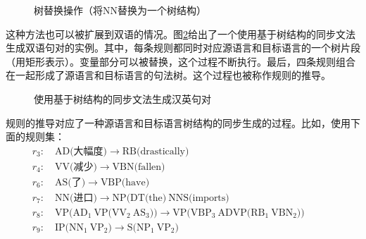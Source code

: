 \begin{figure}[htp]
\centering

\caption{树替换操作（将NN替换为一个树结构）}
\label{fig:4-47}
\end{figure}

\parinterval 这种方法也可以被扩展到双语的情况。图\ref{fig:4-48}给出了一个使用基于树结构的同步文法生成双语句对的实例。其中，每条规则都同时对应源语言和目标语言的一个树片段（用矩形表示）。变量部分可以被替换，这个过程不断执行。最后，四条规则组合在一起形成了源语言和目标语言的句法树。这个过程也被称作规则的推导。

\begin{figure}[htp]
\centering

\caption{使用基于树结构的同步文法生成汉英句对}
\label{fig:4-48}
\end{figure}

\parinterval 规则的推导对应了一种源语言和目标语言树结构的同步生成的过程。比如，使用下面的规则集：
{
\begin{eqnarray}
r_3: \quad \textrm{AD(大幅度)} \rightarrow \textrm{RB(drastically)}\qquad\qquad\qquad\qquad\qquad\qquad\qquad\ \nonumber \\
r_4: \quad \textrm{VV(减少)} \rightarrow \textrm{VBN(fallen)}\qquad\qquad\qquad\qquad\qquad\qquad\qquad\qquad\ \,\nonumber \\
r_6: \quad \textrm{AS(了)} \rightarrow \textrm{VBP(have)}\qquad\qquad\qquad\qquad\qquad\qquad\qquad\qquad\qquad\, \nonumber \\
r_7: \quad \textrm{NN(进口)} \rightarrow \textrm{NP(DT(the)}\ \textrm{NNS(imports)} \nonumber\ \qquad\qquad\qquad\qquad\qquad\ \,\\
r_8: \quad \textrm{VP(}\textrm{AD}_1\ \textrm{VP(} \textrm{VV}_2\ \textrm{AS}_3)) \rightarrow \textrm{VP(}\textrm{VBP}_3\ \textrm{ADVP(} \textrm{RB}_1\ \textrm{VBN}_2))\ \nonumber \qquad\ \ \,\\
r_9: \quad \textrm{IP(}\textrm{NN}_1\ \textrm{VP}_2) \rightarrow \textrm{S(}\textrm{NP}_1\ \textrm{VP}_2) \qquad\qquad\qquad\qquad\qquad\qquad\qquad\nonumber\ \ \ \ \,
\end{eqnarray}
}

